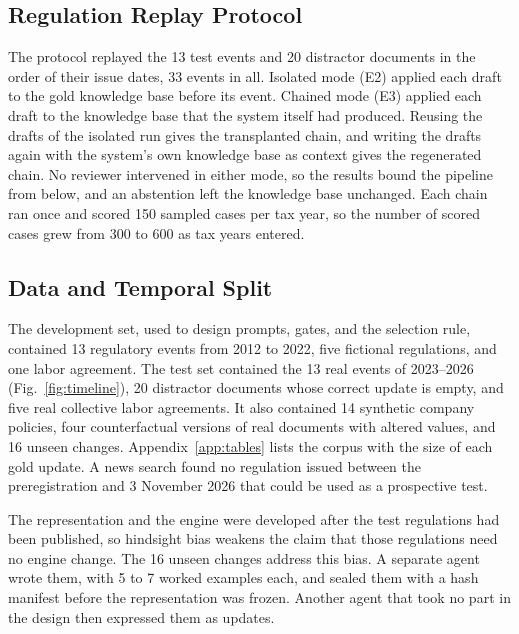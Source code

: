 \subsection{Regulation Replay Protocol}
\label{sec:protocol}
The protocol replayed the 13 test events and 20 distractor documents in the order of their issue dates, 33 events in all. Isolated mode (E2) applied each draft to the gold knowledge base before its event. Chained mode (E3) applied each draft to the knowledge base that the system itself had produced. Reusing the drafts of the isolated run gives the transplanted chain, and writing the drafts again with the system's own knowledge base as context gives the regenerated chain. No reviewer intervened in either mode, so the results bound the pipeline from below, and an abstention left the knowledge base unchanged. Each chain ran once and scored 150 sampled cases per tax year, so the number of scored cases grew from 300 to 600 as tax years entered.

\subsection{Data and Temporal Split}
\label{sec:data}
The development set, used to design prompts, gates, and the selection rule, contained 13 regulatory events from 2012 to 2022, five fictional regulations, and one labor agreement. The test set contained the 13 real events of 2023--2026 (Fig.~\ref{fig:timeline}), 20 distractor documents whose correct update is empty, and five real collective labor agreements. It also contained 14 synthetic company policies, four counterfactual versions of real documents with altered values, and 16 unseen changes. Appendix~\ref{app:tables} lists the corpus with the size of each gold update. A news search found no regulation issued between the preregistration and 3 November 2026 that could be used as a prospective test.

The representation and the engine were developed after the test regulations had been published, so hindsight bias weakens the claim that those regulations need no engine change. The 16 unseen changes address this bias. A separate agent wrote them, with 5 to 7 worked examples each, and sealed them with a hash manifest before the representation was frozen. Another agent that took no part in the design then expressed them as updates.

